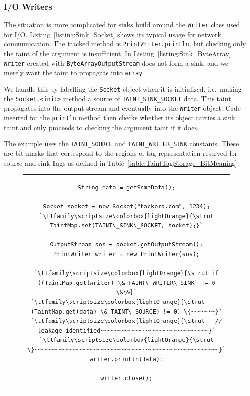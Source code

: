 \documentclass[12pt,twoside,notitlepage]{report}
\newcommand{\highlight}[1]{\colorbox{lightOrange}{\strut #1}}
\newcommand{\lsthl}[1] {\ttfamily\scriptsize\highlight{#1}}
\begin{document}
\subsubsection{I/O Writers}

The situation is more complicated for sinks build around the \verb$Writer$ class used for I/O. Listing~\ref{listing:Sink_Socket} shows its typical usage for network communication. The tracked method is \verb$PrintWriter.println$, but checking only the taint of the argument is insufficient. In Listing~\ref{listing:Sink_ByteArray} \verb$Writer$ created with \verb$ByteArrayOutputStream$ does not form a sink, and we merely want the taint to propagate into \verb$array$. 

We handle this by labelling the \verb$Socket$ object when it is initialized, i.e.\ making the \verb$Socket.<init>$ method a source of \verb$TAINT_SINK_SOCKET$ data. This taint propagates into the output stream and eventually into the \verb$Writer$ object. Code inserted for the \verb$println$ method then checks whether its object carries a sink taint and only proceeds to checking the argument taint if it does.

The example uses the \verb$TAINT_SOURCE$ and \verb$TAINT_WRITER_SINK$ constants. These are bit masks that correspond to the regions of tag representation reserved for source and sink flags as defined in Table~\ref{table:TaintTagStorage_BitMeaning}.

\begin{figure}[h]
	\centering
	\begin{tabular}{c}
	\begin{lstlisting}
String data = getSomeData();

Socket socket = new Socket("hackers.com", 1234);
`\lsthl{TaintMap.set(TAINT\_SINK\_SOCKET, socket);}`

OutputStream sos = socket.getOutputStream();
PrintWriter writer = new PrintWriter(sos);

`\lsthl{if ((TaintMap.get(writer) \& TAINT\_WRITER\_SINK) != 0 \&\&}`
`\lsthl{~~~~(TaintMap.get(data) \& TAINT\_SOURCE) != 0) \{~~~~~~~}`
`\lsthl{~~// leakage identified~~~~~~~~~~~~~~~~~~~~~~~~~~~~~~~}`
`\lsthl{\}~~~~~~~~~~~~~~~~~~~~~~~~~~~~~~~~~~~~~~~~~~~~~~~~~~~~~}`
writer.println(data);

writer.close();
	\end{lstlisting}
	\end{tabular}
	\begin{lstlisting}[caption={Writer interface used for network communication, with sink instrumentation.},
	                   label={listing:Sink_Socket}]
	\end{lstlisting}
\end{figure}
\end{document}
